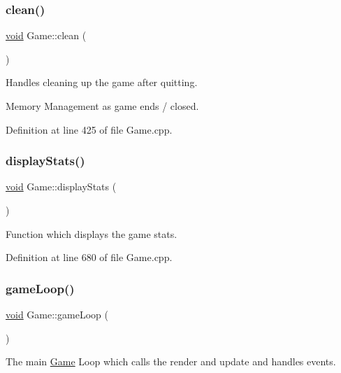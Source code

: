 \subsubsection{\texorpdfstring{clean()}{clean()}}
{\footnotesize\ttfamily \mbox{\hyperlink{_s_d_l__opengles2__gl2ext_8h_ae5d8fa23ad07c48bb609509eae494c95}{void}} Game\+::clean (\begin{DoxyParamCaption}{ }\end{DoxyParamCaption})}



Handles cleaning up the game after quitting. 

Memory Management as game ends / closed. 

Definition at line 425 of file Game.\+cpp.

\mbox{\label{class_game_afb705aeed0fc1c78e264c58fbccf912a}} 
\subsubsection{\texorpdfstring{displayStats()}{displayStats()}}
{\footnotesize\ttfamily \mbox{\hyperlink{_s_d_l__opengles2__gl2ext_8h_ae5d8fa23ad07c48bb609509eae494c95}{void}} Game\+::display\+Stats (\begin{DoxyParamCaption}{ }\end{DoxyParamCaption})}



Function which displays the game stats. 



Definition at line 680 of file Game.\+cpp.

\mbox{\label{class_game_aede5f46c8c7bbbaf8459eeec397a11e7}} 
\subsubsection{\texorpdfstring{gameLoop()}{gameLoop()}}
{\footnotesize\ttfamily \mbox{\hyperlink{_s_d_l__opengles2__gl2ext_8h_ae5d8fa23ad07c48bb609509eae494c95}{void}} Game\+::game\+Loop (\begin{DoxyParamCaption}{ }\end{DoxyParamCaption})}



The main \mbox{\hyperlink{class_game}{Game}} Loop which calls the render and update and handles events. 

